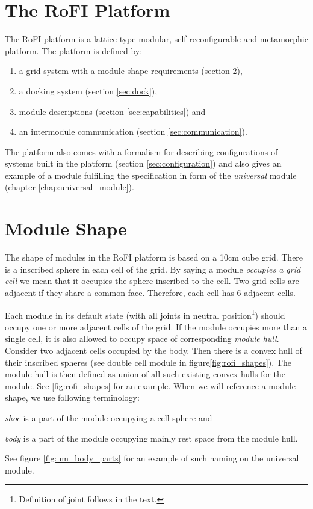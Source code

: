 \section{The RoFI Platform }

The RoFI platform is a lattice type modular, self-reconfigurable and metamorphic
platform. The platform is defined by:
\begin{enumerate}
    \item a grid system with a module shape requirements (section \ref{sec:aware}),
    \item a docking system (section \ref{sec:dock}),
    \item module descriptions (section \ref{sec:capabilities}) and
    \item an intermodule communication (section \ref{sec:communication}).
\end{enumerate}

The platform also comes with a formalism for describing configurations of
systems built in the platform (section \ref{sec:configuration}) and also gives
an example of a module fulfilling the specification in form of the
\emph{universal} module (chapter \ref{chap:universal_module}).

\section{Module Shape}\label{sec:aware}

The shape of modules in the RoFI platform is based on a 10cm cube grid. There is
a inscribed sphere in each cell of the grid. By saying a module \emph{occupies a
grid cell} we mean that it occupies the sphere inscribed to the cell. Two grid
cells are adjacent if they share a common face. Therefore, each cell has 6
adjacent cells.

Each module in its default state (with all joints in neutral
position\footnote{Definition of joint follows in the text.}) should occupy one
or more adjacent cells of the grid. If the module occupies more than a single
cell, it is also allowed to occupy space of corresponding \emph{module hull}.
Consider two adjacent cells occupied by the body. Then there is a convex hull of
their inscribed spheres (see double cell module in figure\ref{fig:rofi_shapes}).
The module hull is then defined as union of all such existing convex hulls for
the module. See \ref{fig:rofi_shapes} for an example. When we will reference a
module shape, we use following terminology:
\begin{enumerate*}
    \item \emph{shoe} is a part of the module occupying a cell sphere and
    \item \emph{body} is a part of the module occupying mainly rest space from
    the module hull.
\end{enumerate*}
See figure \ref{fig:um_body_parts} for an example of such naming on the
universal module.

